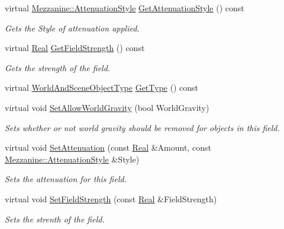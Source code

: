 \begin{DoxyCompactItemize}
virtual \hyperlink{namespaceMezzanine_a2d10a79e11a2031df10af540eede12fa}{Mezzanine::AttenuationStyle} \hyperlink{classMezzanine_1_1GravityWell_ad26c5b44056826e55dac112d0e0600a7}{GetAttenuationStyle} () const 
\begin{DoxyCompactList}\small\item\em Gets the Style of attenuation applied. \item\end{DoxyCompactList}\item 
virtual \hyperlink{namespaceMezzanine_a726731b1a7df72bf3583e4a97282c6f6}{Real} \hyperlink{classMezzanine_1_1GravityWell_a8fe42eeeb7483c35f1dfae170c2b2ec9}{GetFieldStrength} () const 
\begin{DoxyCompactList}\small\item\em Gets the strength of the field. \item\end{DoxyCompactList}\item 
virtual \hyperlink{namespaceMezzanine_ae8cd04f706f4998be62f454b7119c718}{WorldAndSceneObjectType} \hyperlink{classMezzanine_1_1GravityWell_a7890d007afb7021a811d711e3b2ed950}{GetType} () const 
\item 
virtual void \hyperlink{classMezzanine_1_1GravityWell_a80837168a132c3bffcefb839e1669a63}{SetAllowWorldGravity} (bool WorldGravity)
\begin{DoxyCompactList}\small\item\em Sets whether or not world gravity should be removed for objects in this field. \item\end{DoxyCompactList}\item 
virtual void \hyperlink{classMezzanine_1_1GravityWell_ab7668c7c5c1c7c25a40315803efb0790}{SetAttenuation} (const \hyperlink{namespaceMezzanine_a726731b1a7df72bf3583e4a97282c6f6}{Real} \&Amount, const \hyperlink{namespaceMezzanine_a2d10a79e11a2031df10af540eede12fa}{Mezzanine::AttenuationStyle} \&Style)
\begin{DoxyCompactList}\small\item\em Sets the attenuation for this field. \item\end{DoxyCompactList}\item 
virtual void \hyperlink{classMezzanine_1_1GravityWell_a596a662feae83e04e4c299a8aaf8b862}{SetFieldStrength} (const \hyperlink{namespaceMezzanine_a726731b1a7df72bf3583e4a97282c6f6}{Real} \&FieldStrength)
\begin{DoxyCompactList}\small\item\em Sets the strenth of the field. \item\end{DoxyCompactList}\end{DoxyCompactItemize}
